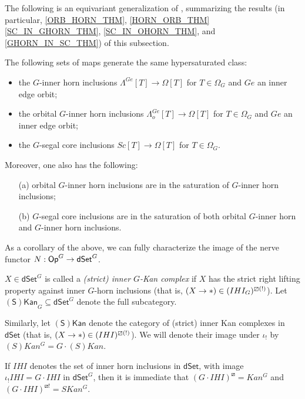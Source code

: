 \documentclass[a4paper,10pt,draft]{article}%
\numberwithin{equation}{section}%
\numberwithin{figure}{section}
\begin{document}
The following is an equivariant generalization of 
\cite[Props. 2.4 and 2.5]{CM13a},
summarizing the results
(in particular, \cref{ORB_HORN_THM}, \cref{HORN_ORB_THM} \cref{SC_IN_GHORN_THM}, \cref{SC_IN_OHORN_THM}, and \cref{GHORN_IN_SC_THM})
of this subsection.

\begin{proposition}
The following sets of maps generate the same hypersaturated class:
\begin{itemize}
\item the $G$-inner horn inclusions
$\Lambda^{Ge} [T] \to \Omega[T]$ for $T \in \Omega_G$ and $Ge$ an inner edge orbit; 
\item the orbital $G$-inner horn inclusions
$\Lambda^{Ge}_o [T] \to \Omega[T]$ for $T \in \Omega_G$ and $Ge$ an inner edge orbit; 
\item the $G$-segal core inclusions
$Sc [T] \to \Omega[T]$ for $T \in \Omega_G$.
\end{itemize}
Moreover, one also has the following:
\begin{itemize}
	\item[(a)] orbital $G$-inner horn inclusions are in the saturation of $G$-inner horn inclusions;
	\item[(b)] $G$-segal core inclusions are in the saturation of both orbital $G$-inner horn and $G$-inner horn inclusions.
\end{itemize}
\end{proposition}


As a corollary of the above, we can fully characterize the image of the nerve functor $N: \mathsf{Op}^G \to \mathsf{dSet}^G$.

\begin{definition}
      $X \in \mathsf{dSet}^G$ is called a \textit{(strict) inner $G$-Kan complex} if
      $X$ has the strict right lifting property against inner $G$-horn inclusions
      (that is, $(X \to \**) \in (IHI_G)^{\boxslash (!)}$).
      Let $\mathsf{(S)Kan}_G \subseteq \mathsf{dSet}^G$ denote the full subcategory.

      Similarly, let $\mathsf{(S)Kan}$ denote the category of
      (strict) inner Kan complexes in $\mathsf{dSet}$
      (that is, $(X \to \**) \in (IHI)^{\boxslash (!)}$).
      We will denote their image under $\iota_!$ by $(S)Kan^G = G \cdot (S)Kan$.
\end{definition}

\begin{remark}
      If $IHI$ denotes the set of inner horn inclusions in $\mathsf{dSet}$,
      with image $\iota_! IHI = G \cdot IHI$ in $\mathsf{dSet}^G$,
      then it is immediate that $(G \cdot IHI)^{\boxslash} = Kan^G$ and $(G \cdot IHI)^{\boxslash !} = SKan^G$.
\end{remark}
\end{document}
